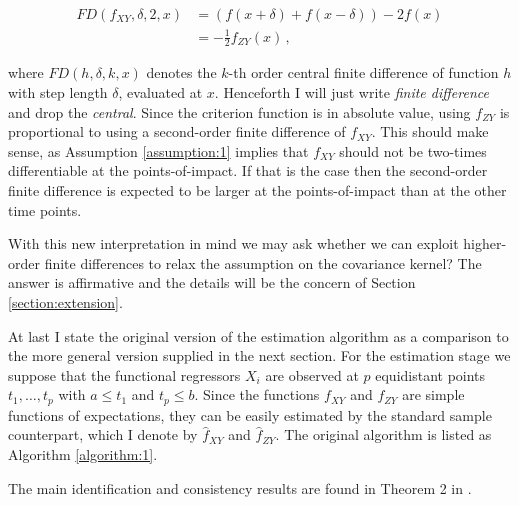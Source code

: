 \begin{align*}
    FD(f_{XY}, \delta, 2, x) &= \left( f(x + \delta) + f(x - \delta) \right) - 2 f(x)\\
                             &= - \frac{1}{2} f_{ZY}(x) \,,
\end{align*}

where $FD(h, \delta, k, x)$ denotes the $k$-th order central finite difference of
function $h$ with step length $\delta$, evaluated at $x$. Henceforth I will just write
\emph{finite difference} and drop the \emph{central}. Since the criterion function is in
absolute value, using $f_{ZY}$ is proportional to using a second-order finite difference
of $f_{XY}$. This should make sense, as Assumption \ref{assumption:1} implies that
$f_{XY}$ should not be two-times differentiable at the points-of-impact. If that is the
case then the second-order finite difference is expected to be larger at the
points-of-impact than at the other time points.


With this new interpretation in mind we may ask whether we can exploit higher-order
finite differences to relax the assumption on the covariance kernel? The answer is
affirmative and the details will be the concern of Section \ref{section:extension}.


At last I state the original version of the estimation algorithm as a comparison to the
more general version supplied in the next section. For the estimation stage we suppose
that the functional regressors $X_i$ are observed at $p$ equidistant points $t_1, \dots,
t_p$ with $a \leq t_1$ and $t_p \leq b$. Since the functions $f_{XY}$ and $f_{ZY}$ are simple
functions of expectations, they can be easily estimated by the standard sample
counterpart, which I denote by $\hat{f}_{XY}$ and $\hat{f}_{ZY}$. The original algorithm
is listed as Algorithm \ref{algorithm:1}.

The main identification and consistency results are found in Theorem 2 in
\cite{Kneip2020}.

